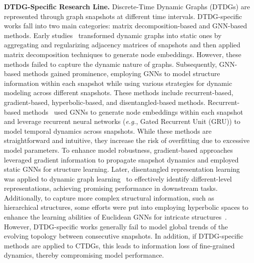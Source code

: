 \noindent\textbf{DTDG-Specific Research Line.} Discrete-Time Dynamic Graphs (DTDGs) are represented through graph snapshots at different time intervals. DTDG-specific works fall into two main categories: matrix decomposition-based and GNN-based methods. Early studies~\cite{DBLP:conf/icdm/SharanN08,li2017attributed,DBLP:conf/icde/ZhuGYSG17,yang2021time} transformed dynamic graphs into static ones by aggregating and regularizing adjacency matrices of snapshots and then applied matrix decomposition techniques to generate node embeddings. However, these methods failed to capture the dynamic nature of graphs. Subsequently, GNN-based methods gained prominence, employing GNNs to model structure information within each snapshot while using various strategies for dynamic modeling across different snapshots. These methods include recurrent-based, gradient-based, hyperbolic-based, and disentangled-based methods. Recurrent-based methods~\cite{DBLP:conf/iconip/SeoDVB18,DBLP:conf/wsdm/SankarWGZY20,DBLP:conf/aaai/ParejaDCMSKKSL20,gao2022novel,DBLP:conf/www/BaiNZZY23,DBLP:conf/icde/0003SLRD23,DBLP:conf/kdd/0001ZKHK21,DBLP:conf/cikm/LiC21,DBLP:conf/www/ZhangYJL23,DBLP:conf/aaai/LiYZC0ZTWM23,qin2023high,zou2023event} used GNNs to generate node embeddings within each snapshot and leverage recurrent neural networks (\textit{e.g.}, Gated Recurrent Unit (GRU)) to model temporal dynamics across snapshots. While these methods are straightforward and intuitive, they increase the risk of overfitting due to excessive model parameters.
To enhance model robustness, gradient-based approaches~\cite{zhu2023wingnn,DBLP:conf/kdd/YouDL22,hao2023dynamic,zhao2024adversarial} leveraged gradient information to propagate snapshot dynamics and employed static GNNs for structure learning. Later, disentangled representation learning was applied to dynamic graph learning~\cite{zhang2023dyted,liu2021anomaly} to effectively identify different-level representations, achieving promising performance in downstream tasks. Additionally, to capture more complex structural information, such as hierarchical structures, some efforts were put into employing hyperbolic spaces to enhance the learning abilities of Euclidean GNNs for intricate structures~\cite{DBLP:conf/www/BaiNZZY23,DBLP:conf/kdd/0001ZKHK21}. However, DTDG-specific works generally fail to model global trends of the evolving topology between consecutive snapshots. In addition, if DTDG-specific methods are applied to CTDGs, this leads to information loss of fine-grained dynamics, thereby compromising model performance.



